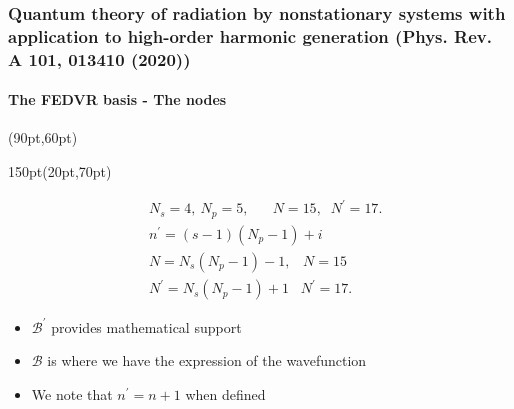 \begin{frame}
\frametitle{Quantum theory of radiation by nonstationary systems 
	with application to high-order harmonic generation
        (Phys. Rev. A 101, 013410 (2020))}
	\framesubtitle{The FEDVR basis - The nodes}

\begin{textblock*}{\linewidth}(90pt,60pt)
\end{textblock*}



\begin{textblock*}{150pt}(20pt,70pt)
\tiny

\begin{align}
& N_s = 4,\ N_p = 5, \hspace{20pt} N = 15,\;\; N^\prime = 17. \nonumber\\
& n^\prime = (s-1)(N_p-1)+i \nonumber\\
& N = N_s (N_p - 1) - 1, \hspace{10pt} N = 15 \nonumber \\
& N^\prime = N_s (N_p - 1) + 1 \hspace{10pt} N^\prime = 17. \nonumber
\end{align}
\footnotesize
\begin{itemize}
\item $\mathcal{B}^\prime$ provides mathematical support
\item $\mathcal{B}$ is where we have the expression of the wavefunction
\item We note that $n^\prime = n +1$ when defined
\end{itemize}

\end{textblock*}
\end{frame}





